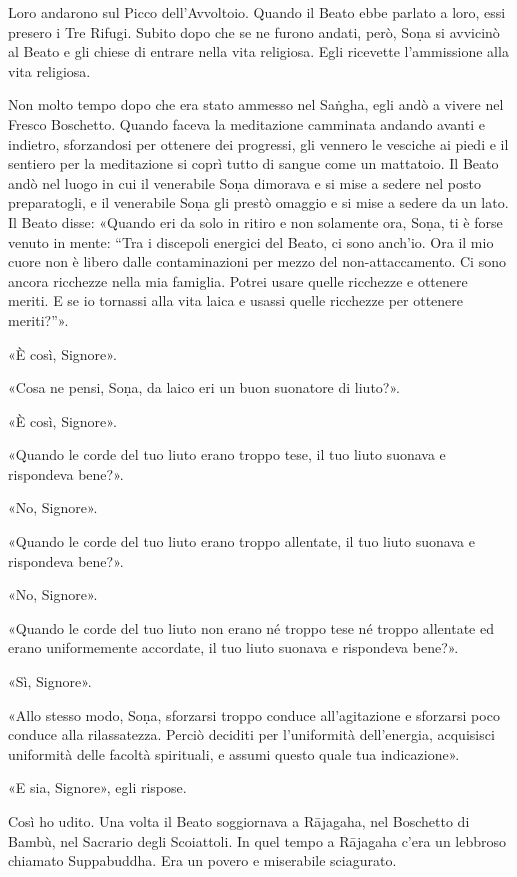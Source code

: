 Loro andarono sul Picco dell’Avvoltoio. Quando il Beato ebbe parlato a
loro, essi presero i Tre Rifugi. Subito dopo che se ne furono andati,
però, Soṇa si avvicinò al Beato e gli chiese di entrare nella vita
religiosa. Egli ricevette l’ammissione alla vita religiosa.


Non molto tempo dopo che era stato ammesso nel Saṅgha, egli andò a
vivere nel Fresco Boschetto. Quando faceva la meditazione camminata
andando avanti e indietro, sforzandosi per ottenere dei progressi, gli
vennero le vesciche ai piedi e il sentiero per la meditazione si coprì
tutto di sangue come un mattatoio. Il Beato andò nel luogo in cui il
venerabile Soṇa dimorava e si mise a sedere nel posto preparatogli, e il
venerabile Soṇa gli prestò omaggio e si mise a sedere da un lato. Il
Beato disse: «Quando eri da solo in ritiro e non solamente ora, Soṇa, ti
è forse venuto in mente: “Tra i discepoli energici del Beato, ci sono
anch’io. Ora il mio cuore non è libero dalle contaminazioni per mezzo
del non-attaccamento. Ci sono ancora ricchezze nella mia famiglia.
Potrei usare quelle ricchezze e ottenere meriti. E se io tornassi alla
vita laica e usassi quelle ricchezze per ottenere meriti?”».


«È così, Signore».


«Cosa ne pensi, Soṇa, da laico eri un buon suonatore di liuto?».


«È così, Signore».


«Quando le corde del tuo liuto erano troppo tese, il tuo liuto suonava e
rispondeva bene?».


«No, Signore».


«Quando le corde del tuo liuto erano troppo allentate, il tuo liuto
suonava e rispondeva bene?».


«No, Signore».


«Quando le corde del tuo liuto non erano né troppo tese né troppo
allentate ed erano uniformemente accordate, il tuo liuto suonava e
rispondeva bene?».


«Sì, Signore».


«Allo stesso modo, Soṇa, sforzarsi troppo conduce all’agitazione e
sforzarsi poco conduce alla rilassatezza. Perciò deciditi per
l’uniformità dell’energia, acquisisci uniformità delle facoltà
spirituali, e assumi questo quale tua indicazione».


«E sia, Signore», egli rispose.




 Così ho udito. Una volta il Beato soggiornava a Rājagaha,
nel Boschetto di Bambù, nel Sacrario degli Scoiattoli. In quel tempo a
Rājagaha c’era un lebbroso chiamato Suppabuddha. Era un povero e
miserabile sciagurato.


